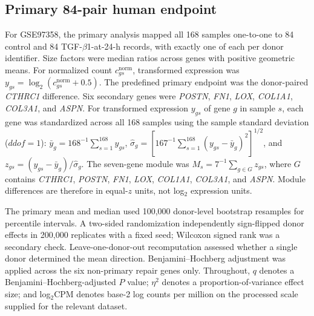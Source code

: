 \documentclass[preprint,11pt]{elsarticle}
\newcommand{\cthrc}{\textit{CTHRC1}}
\newcommand{\tgfb}{TGF-$\beta$1}
\begin{document}
\subsection{Primary 84-pair human endpoint}
For GSE97358, the primary analysis mapped all 168 samples one-to-one to 84 control and 84 \tgfb{}-at-24-h records, with exactly one of each per donor identifier. Size factors were median ratios across genes with positive geometric means. For normalized count $c^{\mathrm{norm}}_{gs}$, transformed expression was $y_{gs}=\log_2(c^{\mathrm{norm}}_{gs}+0.5)$. The predefined primary endpoint was the donor-paired \cthrc{} difference. Six secondary genes were \textit{POSTN}, \textit{FN1}, \textit{LOX}, \textit{COL1A1}, \textit{COL3A1}, and \textit{ASPN}. For transformed expression $y_{gs}$ of gene $g$ in sample $s$, each gene was standardized across all 168 samples using the sample standard deviation (\(ddof=1\)): $\bar{y}_g=168^{-1}\sum_{s=1}^{168}y_{gs}$, $\widehat{\sigma}_g=\left[167^{-1}\sum_{s=1}^{168}(y_{gs}-\bar{y}_g)^2\right]^{1/2}$, and $z_{gs}=(y_{gs}-\bar{y}_g)/\widehat{\sigma}_g$. The seven-gene module was $M_s=7^{-1}\sum_{g\in G}z_{gs}$, where $G$ contains \cthrc{}, \textit{POSTN}, \textit{FN1}, \textit{LOX}, \textit{COL1A1}, \textit{COL3A1}, and \textit{ASPN}. Module differences are therefore in equal-$z$ units, not log$_2$ expression units.

The primary mean and median used 100,000 donor-level bootstrap resamples for percentile intervals. A two-sided randomization independently sign-flipped donor effects in 200,000 replicates with a fixed seed; Wilcoxon signed rank was a secondary check. Leave-one-donor-out recomputation assessed whether a single donor determined the mean direction. Benjamini--Hochberg adjustment was applied across the six non-primary repair genes only. Throughout, $q$ denotes a Benjamini--Hochberg-adjusted $P$ value; $\eta^2$ denotes a proportion-of-variance effect size; and log$_2$CPM denotes base-2 log counts per million on the processed scale supplied for the relevant dataset.
\end{document}
